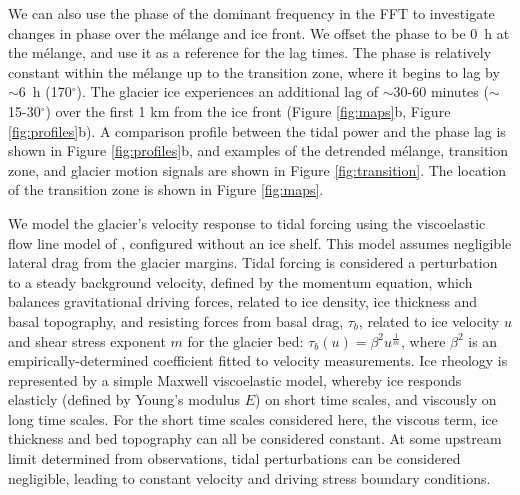 We can also use the phase of the dominant frequency in the FFT to investigate changes in phase over the m\'elange and ice front. We offset the phase to be 0~h at the m\'elange, and use it as a reference for the lag times. The phase is relatively constant within the m\'elange up to the transition zone, where it begins to lag by $\sim$6~h (170$^{\circ}$). The glacier ice experiences an additional lag of $\sim$30-60 minutes ($\sim$15-30$^{\circ}$) over the first 1 km from the ice front (Figure \ref{fig:maps}b, Figure \ref{fig:profiles}b). A comparison profile between the tidal power and the phase lag is shown in Figure \ref{fig:profiles}b, and examples of the detrended m\'elange, transition zone, and glacier motion signals are shown in Figure \ref{fig:transition}. The location of the transition zone is shown in Figure \ref{fig:maps}.

We model the glacier’s velocity response to tidal forcing using the viscoelastic flow line model of \citet{walker2012viscoelastic,walker2014ice}, configured without an ice shelf. This model assumes negligible lateral drag from the glacier margins.   Tidal forcing is considered a perturbation to a steady background velocity, defined by the momentum equation, which balances gravitational driving forces, related to ice density, ice thickness and basal topography,  and resisting forces from basal drag, $\tau_b$, related to ice velocity $u$ and shear stress exponent $m$ for the glacier bed: $\tau_b (u)=\beta^2 u^{\frac{1}{m}}$, where $\beta^2$ is an empirically-determined coefficient fitted to velocity measurements. Ice rheology is represented by a simple Maxwell viscoelastic model, whereby ice responds elasticly (defined by Young’s modulus $E$) on short time scales, and viscously on long time scales.  For the short time scales considered here, the viscous term, ice thickness and bed topography can all be considered constant.  At some upstream limit determined from observations, tidal perturbations can be considered negligible, leading to constant velocity and driving stress boundary conditions.  

